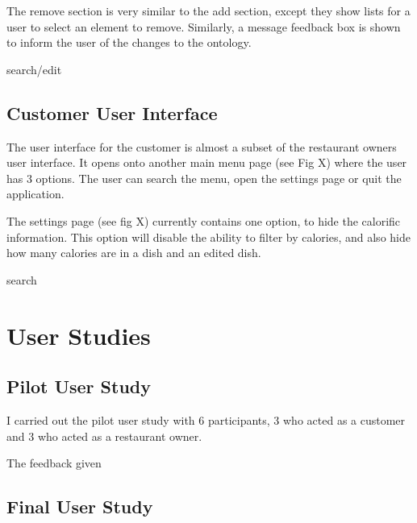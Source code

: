 The remove section is very similar to the add section, except they show lists for a user to select an element to remove. Similarly, a message feedback box is shown to inform the user of the changes to the ontology.

search/edit

\subsection{Customer User Interface}

The user interface for the customer is almost a subset of the restaurant owners user interface. It opens onto another main menu page (see Fig X) where the user has 3 options. The user can search the menu, open the settings page or quit the application.

The settings page (see fig X) currently contains one option, to hide the calorific information. This option will disable the ability to filter by calories, and also hide how many calories are in a dish and an edited dish.

search

\section{User Studies}

\subsection{Pilot User Study}

I carried out the pilot user study with 6 participants, 3 who acted as a customer and 3 who acted as a restaurant owner. 

The feedback given 

\subsection{Final User Study}

